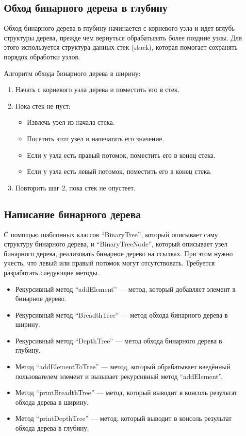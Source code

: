 \documentclass[12pt, a4paper]{article}
\begin{document}
\subsection{Обход бинарного дерева в глубину}
Обход бинарного дерева в глубину начинается с корневого узла и идет вглубь структуры дерева, прежде чем вернуться обрабатывать более поздние узлы. Для этого используется структура данных стек (stack), которая помогает сохранять порядок обработки узлов.

Алгоритм обхода бинарного дерева в ширину:
\begin{enumerate}
    \item Начать с корневого узла дерева и поместить его в стек.
    \item Пока стек не пуст:
    \begin{itemize}
        \item[---] Извлечь узел из начала стека.
        \item[---] Посетить этот узел и напечатать его значение.
        \item[---] Если у узла есть правый потомок, поместить его в конец стека.
        \item[---] Если у узла есть левый потомок, поместить его в конец стека.
    \end{itemize}
    \item Повторить шаг 2, пока стек не опустеет.
\end{enumerate}

\subsection{Написание бинарного дерева}
С помощью шаблонных классов ``BinaryTree'', который описывает саму структуру бинарного дерева, и ``BinaryTreeNode'', который описывает узел бинарного дерева, реализовать бинарное дерево на ссылках. При этом нужно учесть, что левый или правый потомок могут отсутствовать.  Требуется разработать следующие методы.
\begin{itemize}
    \item[---] Рекурсивный метод ``addElement'' --- метод, который добавляет элемент в бинарное дерево.
    \item[---] Рекурсивный метод ``BreadthTree'' --- метод обхода бинарного дерева в ширину.
    \item[---] Рекурсивный метод ``DepthTree'' --- метод обхода бинарного дерева в глубину.
    \item[---] Метод ``addElementToTree'' --- метод, который обрабатывает введённый пользователем элемент и вызывает рекурсивный метод ``addElement''.
    \item[---] Метод ``printBreadthTree'' --- метод, который выводит в консоль результат обхода дерева в ширину.
    \item[---] Метод ``printDepthTree'' --- метод, который выводит в консоль результат обхода дерева в глубину.
\end{itemize}
\end{document}
